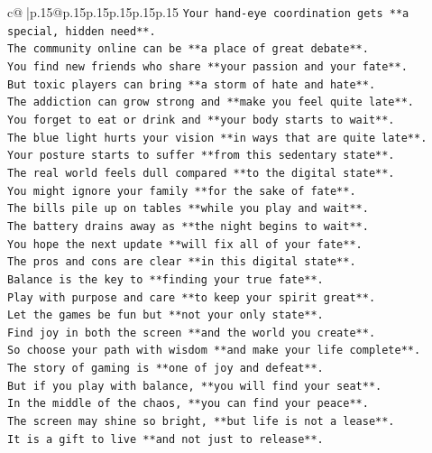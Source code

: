 \documentclass{article}
\begin{document}
{\begin{supertabular}{c@{$\;$}|p{.15\linewidth}@{}p{.15\linewidth}p{.15\linewidth}p{.15\linewidth}p{.15\linewidth}p{.15\linewidth}}
{{{\texttt{Your hand{-}eye coordination gets **a special, hidden need**.} \\
\texttt{The community online can be **a place of great debate**.} \\
\texttt{You find new friends who share **your passion and your fate**.} \\
\texttt{But toxic players can bring **a storm of hate and hate**.} \\
\texttt{The addiction can grow strong and **make you feel quite late**.} \\
\texttt{You forget to eat or drink and **your body starts to wait**.} \\
\texttt{The blue light hurts your vision **in ways that are quite late**.} \\
\texttt{Your posture starts to suffer **from this sedentary state**.} \\
\texttt{The real world feels dull compared **to the digital state**.} \\
\texttt{You might ignore your family **for the sake of fate**.} \\
\texttt{The bills pile up on tables **while you play and wait**.} \\
\texttt{The battery drains away as **the night begins to wait**.} \\
\texttt{You hope the next update **will fix all of your fate**.} \\
\texttt{The pros and cons are clear **in this digital state**.} \\
\texttt{Balance is the key to **finding your true fate**.} \\
\texttt{Play with purpose and care **to keep your spirit great**.} \\
\texttt{Let the games be fun but **not your only state**.} \\
\texttt{Find joy in both the screen **and the world you create**.} \\
\texttt{So choose your path with wisdom **and make your life complete**.} \\
\texttt{The story of gaming is **one of joy and defeat**.} \\
\texttt{But if you play with balance, **you will find your seat**.} \\
\texttt{In the middle of the chaos, **you can find your peace**.} \\
\texttt{The screen may shine so bright, **but life is not a lease**.} \\
\texttt{It is a gift to live **and not just to release**.} \\
}}}
\end{supertabular}}
\end{document}
